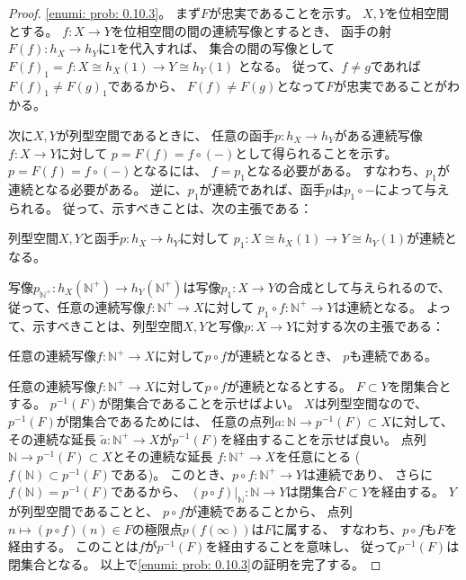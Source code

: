 \documentclass[uplatex]{jsarticle}
\theoremstyle{definition}
\def\N{\mathbb{N}}
\begin{document}
\begin{proof}
  \ref{enumi: prob: 0.10.3}。
  まず\(F\)が忠実であることを示す。
  \(X,Y\)を位相空間とする。
  \(f:X\to Y\)を位相空間の間の連続写像とするとき、
  函手の射\(F(f):h_X\to h_Y\)に\(1\)を代入すれば、
  集合の間の写像として
  \(F(f)_1=f:X\cong h_X(1) \to Y\cong h_Y(1)\)
  となる。
  従って、\(f\neq g\)であれば\(F(f)_1\neq F(g)_1\)であるから、
  \(F(f)\neq F(g)\)となって\(F\)が忠実であることがわかる。

  次に\(X,Y\)が列型空間であるときに、
  任意の函手\(p:h_X\to h_Y\)がある連続写像\(f:X\to Y\)に対して
  \(p = F(f) = f\circ (-)\)として得られることを示す。
  \(p = F(f) = f\circ (-)\)となるには、
  \(f = p_1\)となる必要がある。
  すなわち、\(p_1\)が連続となる必要がある。
  逆に、\(p_1\)が連続であれば、函手\(p\)は\(p_1\circ -\)によって与えられる。
  従って、示すべきことは、次の主張である：
  \begin{center}
    列型空間\(X,Y\)と函手\(p:h_X\to h_Y\)に対して
    \(p_1:X\cong h_X(1) \to Y \cong h_Y(1)\)が連続となる。
  \end{center}
  写像\(p_{\N^+}:h_X(\N^+)\to h_Y(\N^+)\)は写像\(p_1:X\to Y\)の合成として与えられるので、
  従って、任意の連続写像\(f:\N^+\to X\)に対して
  \(p_1\circ f:\N^+\to Y\)は連続となる。
  よって、示すべきことは、列型空間\(X,Y\)と写像\(p:X\to Y\)に対する次の主張である：
  \begin{center}
    任意の連続写像\(f:\N^+\to X\)に対して\(p\circ f\)が連続となるとき、
    \(p\)も連続である。
  \end{center}
  任意の連続写像\(f:\N^+\to X\)に対して\(p\circ f\)が連続となるとする。
  \(F\subset Y\)を閉集合とする。
  \(p^{-1}(F)\)が閉集合であることを示せばよい。
  \(X\)は列型空間なので、
  \(p^{-1}(F)\)が閉集合であるためには、
  任意の点列\(a:\N\to p^{-1}(F)\subset X\)に対して、その連続な延長
  \(\tilde{a}:\N^+ \to X\)が\(p^{-1}(F)\)を経由することを示せば良い。
  点列\(\N\to p^{-1}(F)\subset X\)とその連続な延長
  \(f:\N^+ \to X\)を任意にとる (\(f(\N)\subset p^{-1}(F)\)である)。
  このとき、\(p\circ f: \N^+\to Y\)は連続であり、
  さらに\(f(\N) = p^{-1}(F)\)であるから、
  \((p\circ f)|_{\N} : \N\to Y\)は閉集合\(F\subset Y\)を経由する。
  \(Y\)が列型空間であることと、
  \(p\circ f\)が連続であることから、
  点列\(n\mapsto (p\circ f)(n)\in F\)の極限点\(p(f(\infty))\)は\(F\)に属する、
  すなわち、\(p\circ f\)も\(F\)を経由する。
  このことは\(f\)が\(p^{-1}(F)\)を経由することを意味し、
  従って\(p^{-1}(F)\)は閉集合となる。
  以上で\ref{enumi: prob: 0.10.3}の証明を完了する。


\end{proof}
\end{document}
